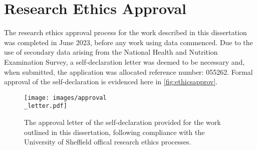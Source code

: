 \appendix

\chapter{Research Ethics Approval}\label{apx:ethics}

The research ethics approval process for the work described in this dissertation was completed in June 2023, before any work using data commenced. Due to the use of secondary data arising from the National Health and Nutrition Examination Survey, a self-declaration letter was deemed to be necessary and, when submitted, the application was allocated reference number: 055262. Formal approval of the self-declaration is evidenced here in \autoref{fig:ethicsapprov}. 

\begin{figure}
\texttt{[image: images/approval\\\_letter.pdf]}
\caption{The approval letter of the self-declaration provided for the work outlined in this dissertation, following compliance with the University of Sheffield offical research ethics processes.}
\label{fig:ethicsapprov}
\end{figure}